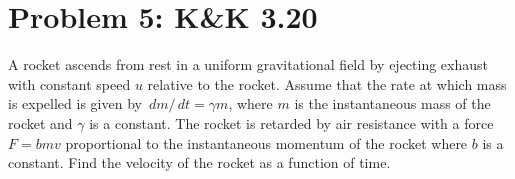 \documentclass[problems]{esg8012pset}
\renewcommand{\d}{\,d}
\begin{document}
\section*{Problem 5: K\&K 3.20}
  A rocket ascends from rest in a uniform gravitational field by ejecting exhaust with constant speed $u$ relative to the rocket. Assume that the rate at which mass is expelled is given by $\d m / \d t = \gamma m$, where $m$ is the instantaneous mass of the rocket and $\gamma$ is a constant. The rocket is retarded by air resistance with a force $F = b m v$ proportional to the instantaneous momentum of the rocket where $b$ is a constant. Find the velocity of the rocket as a function of time.
\end{document}
